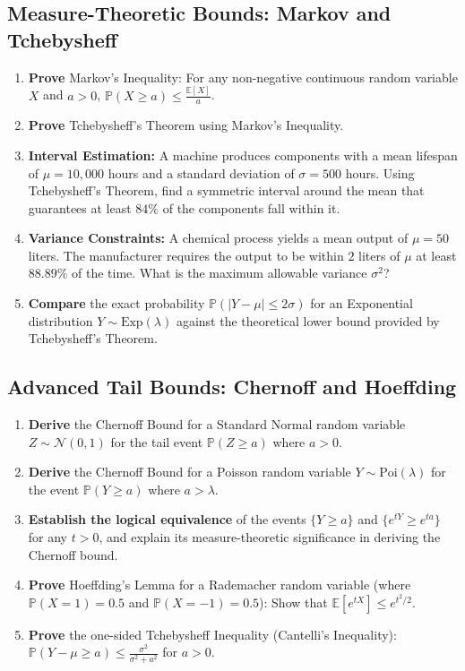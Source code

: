 \documentclass[11pt, a4paper]{article}
\theoremstyle{definition}
\theoremstyle{remark}
\newcommand{\E}{\mathbb{E}}
\newcommand{\Prob}{\mathbb{P}}
\begin{document}
\subsection{Measure-Theoretic Bounds: Markov and Tchebysheff}
\begin{enumerate}[label=\textbf{\arabic*.}, resume]
    \item \textbf{Prove} Markov's Inequality: For any non-negative continuous random variable $X$ and $a > 0$, $\Prob(X \ge a) \le \frac{\E[X]}{a}$.
    \item \textbf{Prove} Tchebysheff's Theorem using Markov's Inequality.
    \item \textbf{Interval Estimation:} A machine produces components with a mean lifespan of $\mu = 10,000$ hours and a standard deviation of $\sigma = 500$ hours. Using Tchebysheff's Theorem, find a symmetric interval around the mean that guarantees at least $84\%$ of the components fall within it.
    \item \textbf{Variance Constraints:} A chemical process yields a mean output of $\mu = 50$ liters. The manufacturer requires the output to be within $2$ liters of $\mu$ at least $88.89\%$ of the time. What is the maximum allowable variance $\sigma^2$?
    \item \textbf{Compare} the exact probability $\Prob(|Y - \mu| \le 2\sigma)$ for an Exponential distribution $Y \sim \text{Exp}(\lambda)$ against the theoretical lower bound provided by Tchebysheff's Theorem.
\end{enumerate}

\subsection{Advanced Tail Bounds: Chernoff and Hoeffding}
\begin{enumerate}[label=\textbf{\arabic*.}, resume]
    \item \textbf{Derive} the Chernoff Bound for a Standard Normal random variable $Z \sim \mathcal{N}(0,1)$ for the tail event $\Prob(Z \ge a)$ where $a > 0$.
    \item \textbf{Derive} the Chernoff Bound for a Poisson random variable $Y \sim \text{Poi}(\lambda)$ for the event $\Prob(Y \ge a)$ where $a > \lambda$.
    \item \textbf{Establish the logical equivalence} of the events $\{Y \ge a\}$ and $\{e^{tY} \ge e^{ta}\}$ for any $t > 0$, and explain its measure-theoretic significance in deriving the Chernoff bound.
    \item \textbf{Prove} Hoeffding's Lemma for a Rademacher random variable (where $\Prob(X=1) = 0.5$ and $\Prob(X=-1) = 0.5$): Show that $\E[e^{tX}] \le e^{t^2/2}$.
    \item \textbf{Prove} the one-sided Tchebysheff Inequality (Cantelli's Inequality): $\Prob(Y - \mu \ge a) \le \frac{\sigma^2}{\sigma^2 + a^2}$ for $a > 0$.
\end{enumerate}
\end{document}
